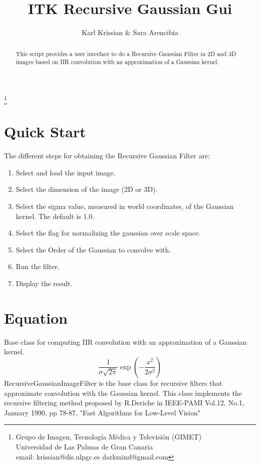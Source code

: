 \documentclass{article}
\begin{document}
\title{ITK Recursive Gaussian Gui}
\author{Karl Krissian \& Sara Arencibia}
\thanks{
Grupo de Imagen, Tecnolog\'ia M\'edica y Televisi\'on (GIMET)\\
Universidad de Las Palmas de Gran Canaria\\
email: krissian@dis.ulpgc.es darkmind@gmail.com
}


\maketitle

\begin{abstract}
This script provides a user interface to do a Recursive Gaussian Filter in 2D and 3D images based on IIR convolution with an approximation of a Gaussian kernel.
\end{abstract}


\section{Quick Start}

The different steps for obtaining the Recursive Gaussian Filter are:
\begin{enumerate}
  \item Select and load the input image.
  \item Select the dimension of the image (2D or 3D).
  \item Select the sigma value, measured in world coordinates, of the Gaussian kernel. The default is 1.0.
  \item Select the flag for normalizing the gaussian over scale space.
  \item Select the Order of the Gaussian to convolve with.
  \item Run the filter.
  \item Display the result.
\end{enumerate}


\section{Equation}
Base class for computing IIR convolution with an approximation of a Gaussian kernel.
\[\frac1{\sigma\sqrt{2\pi}}\exp\left(-\frac{x^2}{2\sigma^2}\right)\]
RecursiveGaussianImageFilter is the base class for recursive filters that approximate convolution with the Gaussian kernel. This class implements the recursive filtering method proposed by R.Deriche in IEEE-PAMI Vol.12, No.1, January 1990, pp 78-87, "Fast Algorithms for Low-Level Vision"
\end{document}
